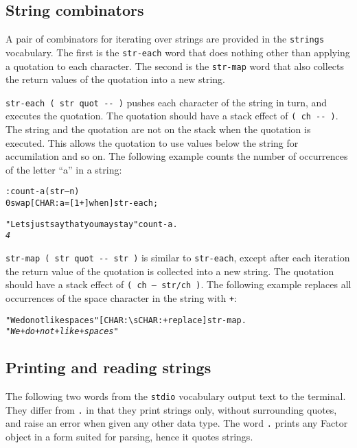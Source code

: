 \documentclass[english]{article}
\begin{document}
\subsection{String combinators}

A pair of combinators for iterating over strings are provided in the \texttt{strings} vocabulary. The first is the \texttt{str-each} word that does nothing other than applying a quotation to each character. The second is the \texttt{str-map} word that also collects the return values of the quotation into a new string.

\texttt{str-each ( str quot -{}- )} pushes each character of the string in turn, and executes the quotation. The quotation should have a stack effect of \texttt{( ch -{}- )}. The string and the quotation are not on the stack when the quotation is executed. This allows the quotation to use values below the string for accumilation and so on. The following example counts the number of occurrences of the letter ``a'' in a string:

\begin{alltt}
: count-a ( str -- n )
    0 swap {[} CHAR: a = {[} 1 + {]} when {]} str-each ;

"Lets just say that you may stay" count-a .
\emph{4}
\end{alltt}

\texttt{str-map ( str quot -{}- str )} is similar to \texttt{str-each}, except after each iteration the return value of the quotation is collected into a new string. The quotation should have a stack effect of \texttt{( ch -- str/ch )}. The following example replaces all occurrences of the space character in the string with \texttt{+}:

\begin{alltt}
"We do not like spaces" {[} CHAR: \textbackslash{}s CHAR: + replace {]} str-map .
\emph{"We+do+not+like+spaces"}
\end{alltt}

\subsection{Printing and reading strings}

The following two words from the \texttt{stdio} vocabulary output text to the terminal. They differ from \texttt{.}
in that they print strings only, without surrounding quotes, and raise
an error when given any other data type. The word \texttt{.} prints any Factor
object in a form suited for parsing, hence it quotes strings.
\end{document}
